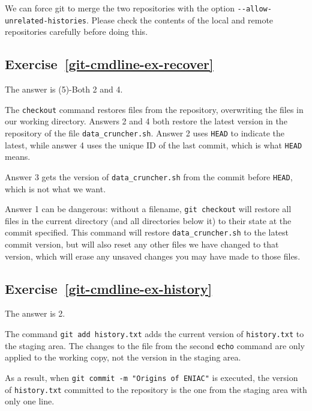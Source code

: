 \documentclass[
]{krantz}
\begin{document}
We can force git to merge the two repositories with the option \texttt{-\/-allow-unrelated-histories}.
Please check the contents of the local and remote repositories carefully before doing this.

\hypertarget{exercise-refgit-cmdline-ex-recover}{%
\subsection*{Exercise~\ref{git-cmdline-ex-recover}}\label{exercise-refgit-cmdline-ex-recover}}


The answer is (5)-Both 2 and 4.

The \texttt{checkout} command restores files from the repository,
overwriting the files in our working directory.
Answers 2 and 4 both restore the latest version in the repository of the file \texttt{data\_cruncher.sh}.
Answer 2 uses \texttt{HEAD} to indicate the latest,
while answer 4 uses the unique ID of the last commit,
which is what \texttt{HEAD} means.

Answer 3 gets the version of \texttt{data\_cruncher.sh} from the commit before \texttt{HEAD},
which is not what we want.

Answer 1 can be dangerous:
without a filename,
\texttt{git\ checkout} will restore all files in the current directory (and all directories below it)
to their state at the commit specified.
This command will restore \texttt{data\_cruncher.sh} to the latest commit version,
but will also reset any other files we have changed to that version,
which will erase any unsaved changes you may have made to those files.

\hypertarget{exercise-refgit-cmdline-ex-history}{%
\subsection*{Exercise~\ref{git-cmdline-ex-history}}\label{exercise-refgit-cmdline-ex-history}}


The answer is 2.

The command \texttt{git\ add\ history.txt} adds the current version of \texttt{history.txt} to the staging area.
The changes to the file from the second \texttt{echo} command are only applied to the working copy,
not the version in the staging area.

As a result,
when \texttt{git\ commit\ -m\ "Origins\ of\ ENIAC"} is executed,
the version of \texttt{history.txt} committed to the repository is the one from the staging area
with only one line.
\end{document}
